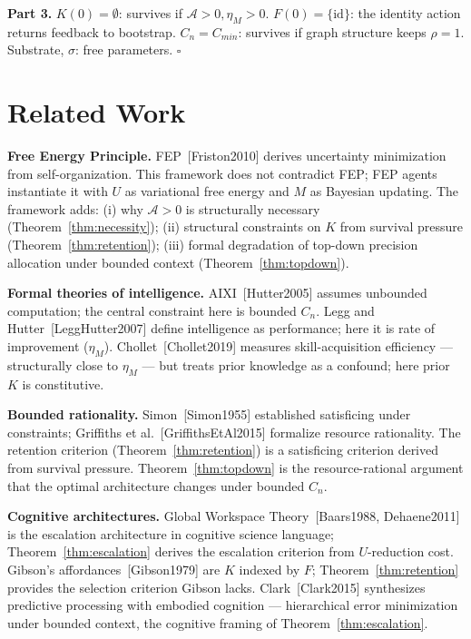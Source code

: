 \documentclass[11pt]{article}
\begin{document}
\textbf{Part 3.} $K(0) = \emptyset$: survives if $\mathcal{A} > 0, \eta_M > 0$. $F(0) = \{\text{id}\}$: the identity action returns feedback to bootstrap. $C_n = C_{min}$: survives if graph structure keeps $\rho = 1$. Substrate, $\sigma$: free parameters. $\square$

\section{Related Work}

\textbf{Free Energy Principle.} FEP~[Friston2010] derives uncertainty minimization from self-organization. This framework does not contradict FEP; FEP agents instantiate it with $U$ as variational free energy and $M$ as Bayesian updating. The framework adds: (i) why $\mathcal{A} > 0$ is structurally necessary (Theorem~\ref{thm:necessity}); (ii) structural constraints on $K$ from survival pressure (Theorem~\ref{thm:retention}); (iii) formal degradation of top-down precision allocation under bounded context (Theorem~\ref{thm:topdown}).

\textbf{Formal theories of intelligence.} AIXI~[Hutter2005] assumes unbounded computation; the central constraint here is bounded $C_n$. Legg and Hutter~[LeggHutter2007] define intelligence as performance; here it is rate of improvement ($\eta_M$). Chollet~[Chollet2019] measures skill-acquisition efficiency --- structurally close to $\eta_M$ --- but treats prior knowledge as a confound; here prior $K$ is constitutive.

\textbf{Bounded rationality.} Simon~[Simon1955] established satisficing under constraints; Griffiths et al.~[GriffithsEtAl2015] formalize resource rationality. The retention criterion (Theorem~\ref{thm:retention}) is a satisficing criterion derived from survival pressure. Theorem~\ref{thm:topdown} is the resource-rational argument that the optimal architecture changes under bounded $C_n$.

\textbf{Cognitive architectures.} Global Workspace Theory~[Baars1988, Dehaene2011] is the escalation architecture in cognitive science language; Theorem~\ref{thm:escalation} derives the escalation criterion from $U$-reduction cost. Gibson's affordances~[Gibson1979] are $K$ indexed by $F$; Theorem~\ref{thm:retention} provides the selection criterion Gibson lacks. Clark~[Clark2015] synthesizes predictive processing with embodied cognition --- hierarchical error minimization under bounded context, the cognitive framing of Theorem~\ref{thm:escalation}.
\end{document}
